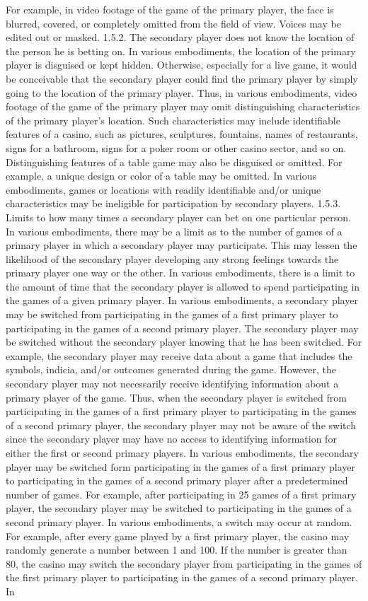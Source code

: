 \documentclass[11pt,a4paper]{article}
\begin{document}
For example, in video footage of the game of the primary player, the face is blurred, covered, or completely omitted from the field of view. Voices may be edited out or masked. 1.5.2. The secondary player does not know the location of the person he is betting on. In various embodiments, the location of the primary player is disguised or kept hidden. Otherwise, especially for a live game, it would be conceivable that the secondary player could find the primary player by simply going to the location of the primary player. Thus, in various embodiments, video footage of the game of the primary player may omit distinguishing characteristics of the primary player's location. Such characteristics may include identifiable features of a casino, such as pictures, sculptures, fountains, names of restaurants, signs for a bathroom, signs for a poker room or other casino sector, and so on. Distinguishing features of a table game may also be disguised or omitted. For example, a unique design or color of a table may be omitted. In various embodiments, games or locations with readily identifiable and/or unique characteristics may be ineligible for participation by secondary players. 1.5.3. Limits to how many times a secondary player can bet on one particular person. In various embodiments, there may be a limit as to the number of games of a primary player in which a secondary player may participate. This may lessen the likelihood of the secondary player developing any strong feelings towards the primary player one way or the other. In various embodiments, there is a limit to the amount of time that the secondary player is allowed to spend participating in the games of a given primary player. In various embodiments, a secondary player may be switched from participating in the games of a first primary player to participating in the games of a second primary player. The secondary player may be switched without the secondary player knowing that he has been switched. For example, the secondary player may receive data about a game that includes the symbols, indicia, and/or outcomes generated during the game. However, the secondary player may not necessarily receive identifying information about a primary player of the game. Thus, when the secondary player is switched from participating in the games of a first primary player to participating in the games of a second primary player, the secondary player may not be aware of the switch since the secondary player may have no access to identifying information for either the first or second primary players. In various embodiments, the secondary player may be switched form participating in the games of a first primary player to participating in the games of a second primary player after a predetermined number of games. For example, after participating in 25 games of a first primary player, the secondary player may be switched to participating in the games of a second primary player. In various embodiments, a switch may occur at random. For example, after every game played by a first primary player, the casino may randomly generate a number between 1 and 100. If the number is greater than 80, the casino may switch the secondary player from participating in the games of the first primary player to participating in the games of a second primary player. In 
\end{document}
